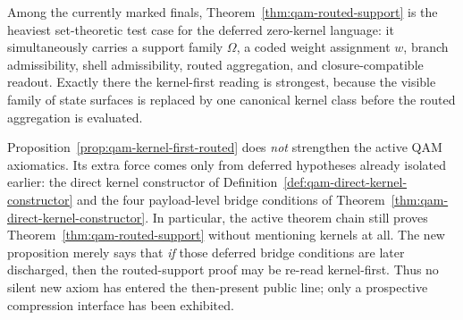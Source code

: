 \begin{remark}
Among the currently marked finals, Theorem~\ref{thm:qam-routed-support} is the heaviest set-theoretic test case for the deferred zero-kernel language: it simultaneously carries a support family $\Omega$, a coded weight assignment $w$, branch admissibility, shell admissibility, routed aggregation, and closure-compatible readout. Exactly there the kernel-first reading is strongest, because the visible family of state surfaces is replaced by one canonical kernel class before the routed aggregation is evaluated.
\end{remark}


\begin{remark}\label{rem:qam-kernel-first-routed-audit}
Proposition~\ref{prop:qam-kernel-first-routed} does \emph{not} strengthen the active QAM axiomatics. Its extra force comes only from deferred hypotheses already isolated earlier: the direct kernel constructor of Definition~\ref{def:qam-direct-kernel-constructor} and the four payload-level bridge conditions of Theorem~\ref{thm:qam-direct-kernel-constructor}. In particular, the active theorem chain still proves Theorem~\ref{thm:qam-routed-support} without mentioning kernels at all. The new proposition merely says that \emph{if} those deferred bridge conditions are later discharged, then the routed-support proof may be re-read kernel-first. Thus no silent new axiom has entered the then-present public line; only a prospective compression interface has been exhibited.
\end{remark}

